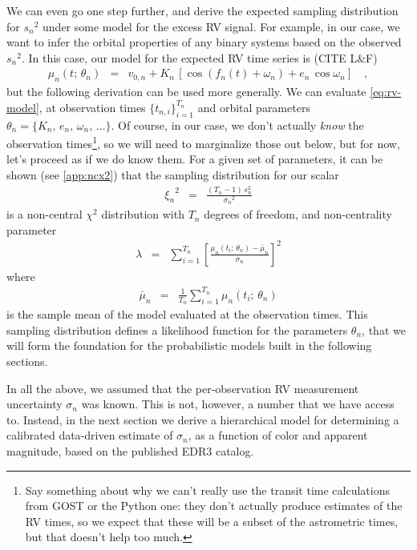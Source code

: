 \documentclass[modern, letterpaper]{aastex631}
\begin{document}
We can even go one step further, and derive the expected sampling distribution for ${s_n}^2$ under some model for the excess RV signal.
For example, in our case, we want to infer the orbital properties of any binary systems based on the observed ${s_n}^2$.
In this case, our model for the expected RV time series is (CITE L\&F)
\begin{eqnarray}
	\mu_n(t;\,\theta_n) &=& v_{0,n} + K_n\,\left[\cos(f_n(t) + \omega_n) + e_n\,\cos \omega_n\right] \quad,
	\label{eq:rv-model}
\end{eqnarray}
but the following derivation can be used more generally.
We can evaluate \autoref{eq:rv-model}, at observation times $\{t_{n,i}\}_{i=1}^{T_n}$ and orbital parameters $\theta_n=\{K_n,\,e_n,\,\omega_n,\,\ldots\}$.
Of course, in our case, we don't actually \emph{know} the observation times\footnote{Say something about why we can't really use the transit time calculations from GOST or the Python one: they don't actually produce estimates of the RV times, so we expect that these will be a subset of the astrometric times, but that doesn't help too much.}, so we will need to marginalize those out below, but for now, let's proceed as if we do know them.
For a given set of parameters, it can be shown (see \autoref{app:ncx2}) that the sampling distribution for our scalar
\begin{eqnarray}
	{\xi_n}^2 &=& \frac{(T_n - 1)\,s_n^2}{{\sigma_n}^2}
	\label{eq:chi-sq-samp2}
\end{eqnarray}
is a non-central $\chi^2$ distribution with $T_n$ degrees of freedom, and non-centrality parameter
\begin{eqnarray}
	\lambda &=& \sum_{i=1}^{T_n} \left[\frac{\mu_n(t_i;\,\theta_n) - \bar{\mu}_n}{\sigma_n}\right]^2
	\label{eq:ncx2-nc-param}
\end{eqnarray}
where
\begin{eqnarray}
	\bar{\mu}_n &=& \frac{1}{T_n}\sum_{i=1}^{T_n} \mu_n(t_i;\,\theta_n)
\end{eqnarray}
is the sample mean of the model evaluated at the observation times.
This sampling distribution defines a likelihood function for the parameters $\theta_n$, that we will form the foundation for the probabilistic models built in the following sections.

In all the above, we assumed that the per-observation RV measurement uncertainty $\sigma_n$ was known.
This is not, however, a number that we have access to.
Instead, in the next section we derive a hierarchical model for determining a calibrated data-driven estimate of $\sigma_n$, as a function of color and apparent magnitude, based on the published EDR3 catalog.
\end{document}
